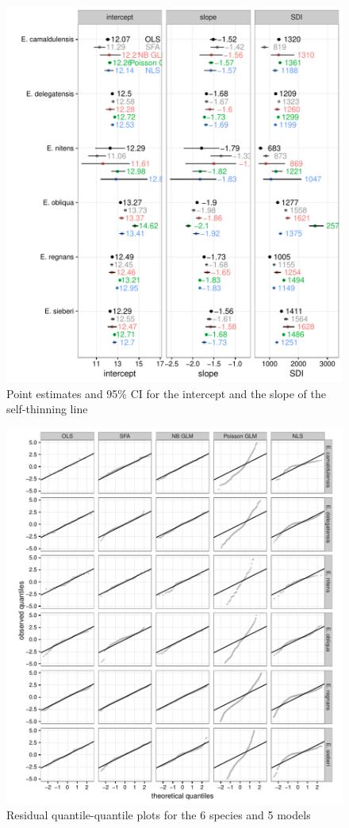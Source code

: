 \documentclass[12pt,english]{article}
\begin{document}
\begin{figure}%
	\centering
	\includegraphics[width=16cm]{fig3.pdf}
	\caption{Point estimates and 95\% CI for the intercept and the slope of the self-thinning line}
	\label{fig:fig3}
\end{figure} 

\begin{figure}%
	\centering
	\includegraphics[width=16cm]{fig4.pdf}
	\caption{Residual quantile-quantile plots for the 6 species and 5 models}
	\label{fig:qqplot}
\end{figure}
	
\end{document}
